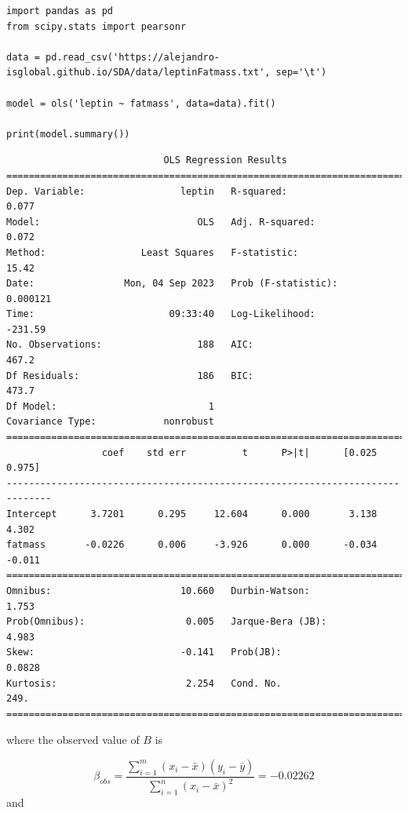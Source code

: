 \documentclass[
]{book}
\begin{document}
\begin{verbatim}
import pandas as pd
from scipy.stats import pearsonr

data = pd.read_csv('https://alejandro-isglobal.github.io/SDA/data/leptinFatmass.txt', sep='\t')

model = ols('leptin ~ fatmass', data=data).fit()

print(model.summary())
\end{verbatim}

\begin{verbatim}
                            OLS Regression Results                            
==============================================================================
Dep. Variable:                 leptin   R-squared:                       0.077
Model:                            OLS   Adj. R-squared:                  0.072
Method:                 Least Squares   F-statistic:                     15.42
Date:                Mon, 04 Sep 2023   Prob (F-statistic):           0.000121
Time:                        09:33:40   Log-Likelihood:                -231.59
No. Observations:                 188   AIC:                             467.2
Df Residuals:                     186   BIC:                             473.7
Df Model:                           1                                         
Covariance Type:            nonrobust                                         
==============================================================================
                 coef    std err          t      P>|t|      [0.025      0.975]
------------------------------------------------------------------------------
Intercept      3.7201      0.295     12.604      0.000       3.138       4.302
fatmass       -0.0226      0.006     -3.926      0.000      -0.034      -0.011
==============================================================================
Omnibus:                       10.660   Durbin-Watson:                   1.753
Prob(Omnibus):                  0.005   Jarque-Bera (JB):                4.983
Skew:                          -0.141   Prob(JB):                       0.0828
Kurtosis:                       2.254   Cond. No.                         249.
==============================================================================

\end{verbatim}

where the observed value of \(B\) is

\[\beta_{obs}= \frac{\sum_{i=1}^m(x_i-\bar{x})(y_i-\bar{y})}{\sum_{i=1}^n(x_i-\bar{x})^2}= -0.02262\]
and
\end{document}
